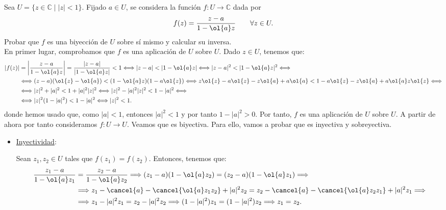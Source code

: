 \begin{ejercicio}
    Sea $U = \{z \in \mathbb{C} \mid |z| < 1\}$. Fijado $a \in U$, se considera la función $f : U \to \mathbb{C}$ dada por
    \[
        f(z) = \dfrac{z-a}{1-\ol{a}z} \qquad \forall z \in U.
    \]
    Probar que $f$ es una biyección de $U$ sobre sí mismo y calcular su inversa.\\

    En primer lugar, comprobamos que $f$ es una aplicación de $U$ sobre $U$. Dado $z \in U$, tenemos que:
    \begin{align*}
        |f(z)| &= \left|\dfrac{z-a}{1-\ol{a}z}\right| = \dfrac{|z-a|}{|1-\ol{a}z|} < 1 \Longleftrightarrow
        |z-a| < |1-\ol{a}z| \Longleftrightarrow
        |z-a|^2 < |1-\ol{a}z|^2 \Longleftrightarrow \\&\Longleftrightarrow
        (z-a)(\ol{z}-\ol{a}) < (1-\ol{a}z)(1-a\ol{z}) \Longleftrightarrow
        z\ol{z}-a\ol{z}-z\ol{a}+a\ol{a} < 1-a\ol{z}-z\ol{a}+a\ol{a} z\ol{z}
        \Longleftrightarrow \\&\Longleftrightarrow
        |z|^2 +|a|^2 < 1+|a|^2|z|^2 \Longleftrightarrow
        |z|^2 - |a|^2|z|^2 < 1-|a|^2 \Longleftrightarrow \\&\Longleftrightarrow
        |z|^2(1-|a|^2) < 1-|a|^2 \Longleftrightarrow
        |z|^2 < 1.
    \end{align*}
    donde hemos usado que, como $|a| < 1$, entonces $|a|^2 < 1$ y por tanto $1-|a|^2 > 0$. Por tanto, $f$ es una aplicación de $U$ sobre $U$. A partir de ahora por tanto consideramos $f : U \to U$. Veamos que es biyectiva. Para ello, vamos a probar que es inyectiva y sobreyectiva.
    \begin{itemize}
        \item \ul{Inyectividad}:
        
        Sean $z_1, z_2 \in U$ tales que $f(z_1) = f(z_2)$. Entonces, tenemos que:
        \begin{align*}
            \dfrac{z_1-a}{1-\ol{a}z_1} &= \dfrac{z_2-a}{1-\ol{a}z_2} \Longrightarrow
            (z_1-a)(1-\ol{a}z_2) = (z_2-a)(1-\ol{a}z_1) \Longrightarrow \\&\Longrightarrow
            z_1 - \cancel{a} - \cancel{\ol{a}z_1z_2} + |a|^2z_2 = z_2 - \cancel{a} - \cancel{\ol{a}z_2z_1} + |a|^2z_1 \Longrightarrow\\&\Longrightarrow
            z_1 - |a|^2z_1 = z_2 - |a|^2z_2 \Longrightarrow 
            (1-|a|^2)z_1 = (1-|a|^2)z_2 \Longrightarrow
            z_1 = z_2.
        \end{align*}


\end{itemize}
\end{ejercicio}
